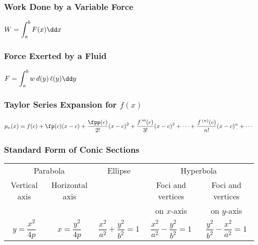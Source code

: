 \noindent
\begin{minipage}[t]{.5\linewidth}
  \subsubsection*{Work Done by a Variable Force}
  $\ds W = \int_a^b{F(x)}\dd x$
\end{minipage}%
\begin{minipage}[t]{.5\linewidth}
 \subsubsection*{Force Exerted by a Fluid}
 $\ds F = \int_a^b{w\,d(y)\,\ell(y)}\dd y$
\end{minipage}

\vfill

\subsubsection*{Taylor Series Expansion for $f(x)$}
\noindent$\ds p_n(x) = f(c) + \fp(c)(x-c) + \frac{\fpp(c)}{2!}(x-c)^2 + \frac{f\,'''(c)}{3!}(x-c)^3 + \dotsb + \frac{f\,^{(n)}(c)}{n!}(x-c)^n + \dotsb $

\vfill


\subsubsection*{Standard Form of Conic Sections}

{\addtolength{\tabcolsep}{6pt}
\begin{tabular}{ c c c c c }
\multicolumn{2}{c}{Parabola} & \hspace{5em}Ellipse\hspace{5em} & \multicolumn{2}{c}{Hyperbola} \\
Vertical axis & Horizontal axis & & Foci and vertices & Foci and vertices \\
& & & on $x$-axis & on $y$-axis \\
$y=\dfrac{x^2}{4p}$ & $x=\dfrac{y^2}{4p}$ & $\dfrac{x^2}{a^2}+\dfrac{y^2}{b^2}=1$ & $\dfrac{x^2}{a^2}-\dfrac{y^2}{b^2}=1$ & $\dfrac{y^2}{b^2}-\dfrac{x^2}{a^2}=1$
\end{tabular}}

